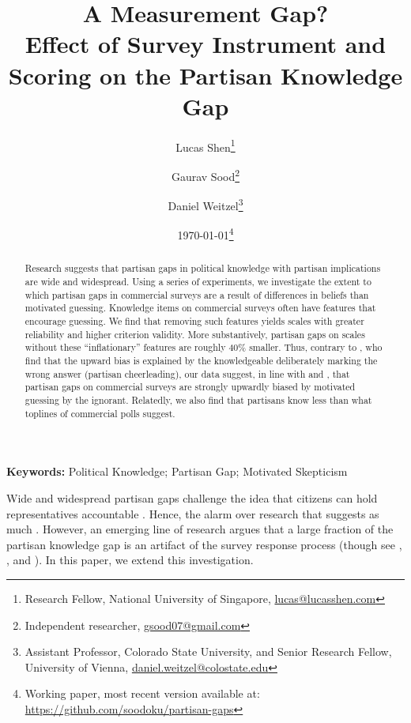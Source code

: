 \documentclass[12pt, letterpaper]{article}
\title{A Measurement Gap? \\ 
       Effect of Survey Instrument and Scoring on the Partisan Knowledge Gap}
\author{Lucas Shen\thanks{Research Fellow, National University of Singapore, \href{lucas@lucasshen.com}{lucas@lucasshen.com}} 
\and
Gaurav Sood\thanks{Independent researcher, \href{gsood07@gmail.com}{gsood07@gmail.com}}  \and
Daniel Weitzel\thanks{Assistant Professor, Colorado State University, and Senior Research Fellow, University of Vienna, \href{mailto:daniel.weitzel@colostate.edu}{daniel.weitzel@colostate.edu}}}
\date{\today \thanks{Working paper, most recent version available at: \href{https://github.com/soodoku/partisan-gaps}{https://github.com/soodoku/partisan-gaps}}}
\begin{document}
\maketitle
\thispagestyle{empty}

\begin{abstract}

\noindent Research suggests that partisan gaps in political knowledge with partisan implications are wide and widespread. Using a series of experiments, we investigate the extent to which partisan gaps in commercial surveys are a result of differences in beliefs than motivated guessing. Knowledge items on commercial surveys often have features that encourage guessing. We find that removing such features yields scales with greater reliability and higher criterion validity. More substantively, partisan gaps on scales without these ``inflationary'' features are roughly 40\% smaller. Thus, contrary to \citet{prior2015you}, who find that the upward bias is explained by the knowledgeable deliberately marking the wrong answer (partisan cheerleading), our data suggest, in line with \citet{bullocketal_2015} and \citet{graham2023less}, that partisan gaps on commercial surveys are strongly upwardly biased by motivated guessing by the ignorant. Relatedly, we also find that partisans know less than what toplines of commercial polls suggest.
\end{abstract}

\vspace{.2in}

{\bf Keywords:} Political Knowledge; Partisan Gap; Motivated Skepticism

\newpage

\doublespacing

Wide and widespread partisan gaps challenge the idea that citizens can hold representatives accountable \citep{hochschild2015isn}. Hence, the alarm over research that suggests as much \citep{bartels_2002, campbell1980american, jerit2012partisan}. However, an emerging line of research argues that a large fraction of the partisan knowledge gap is an artifact of the survey response process \citep{bullocketal_2015, huber_yair_2018, prior2015you, graham2023less} (though see \citet{berinsky_2017}, \citet{peterson2021partisan}, and \citet{malka2022expressive}). In this paper, we extend this investigation.
\end{document}
